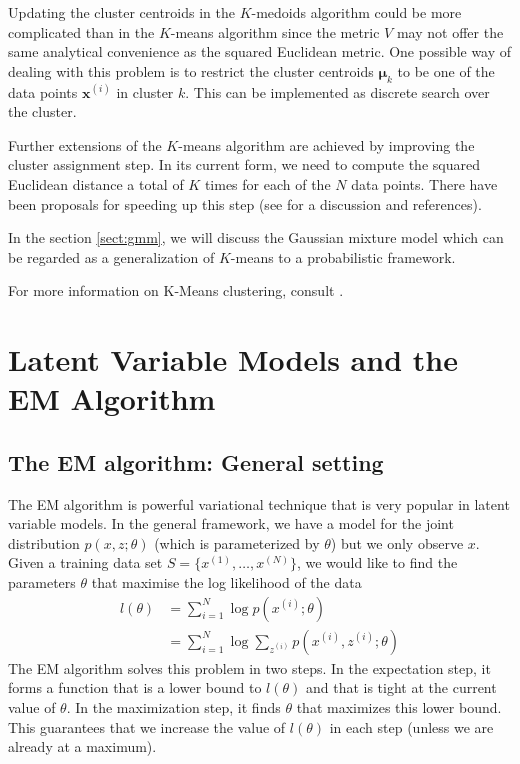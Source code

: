 \documentclass[final,3p,times,twocolumn]{elsarticle}
\let\bs\boldsymbol
\begin{document}
Updating the cluster centroids in the $K$-medoids algorithm could be more complicated than in the $K$-means algorithm since the metric $V$ may not offer the same analytical convenience as the squared Euclidean metric.
One possible way of dealing with this problem is to restrict the cluster centroids $\bs\mu_k$ to be one of the data points $\bs x^{(i)}$ in cluster $k$.
This can be implemented as discrete search over the cluster.

Further extensions of the $K$-means algorithm are achieved by improving the cluster assignment step.
In its current form, we need to compute the squared Euclidean distance a total of $K$ times for each of the $N$ data points.
There have been proposals for speeding up this step (see \cite{Bishop} for a discussion and references).

In the section \ref{sect:gmm}, we will discuss the Gaussian mixture model which can be regarded as a generalization of $K$-means to a probabilistic framework.

For more information on K-Means clustering, consult \cite{Bishop,Murphy}.






\section{Latent Variable Models and the EM Algorithm}
\label{sect:EM}

\subsection{The EM algorithm: General setting}
The EM algorithm is powerful variational technique that is very popular in latent variable models.
In the general framework, we have a model for the joint distribution $p(x,z;\theta)$ (which is parameterized by $\theta$) but we only observe $x$.
Given a training data set $S=\{x^{(1)},\dots,x^{(N)}\}$, we would like to find the parameters $\theta$ that maximise the log likelihood of the data
\begin{equation}
\label{eqn:EMlikelihood}
\begin{split}
l(\theta) &= \sum_{i=1}^N \log p(x^{(i)};\theta)\\
&= \sum_{i=1}^N \log \sum_{z^{(i)}} p(x^{(i)},z^{(i)};\theta)
\end{split}
\end{equation}
The EM algorithm solves this problem in two steps.
In the expectation step, it forms a function that is a lower bound to $l(\theta)$ and that is tight at the current value of $\theta$.
In the maximization step, it finds $\theta$ that maximizes this lower bound.
This guarantees that we increase the value of $l(\theta)$ in each step (unless we are already at a maximum).
\end{document}
